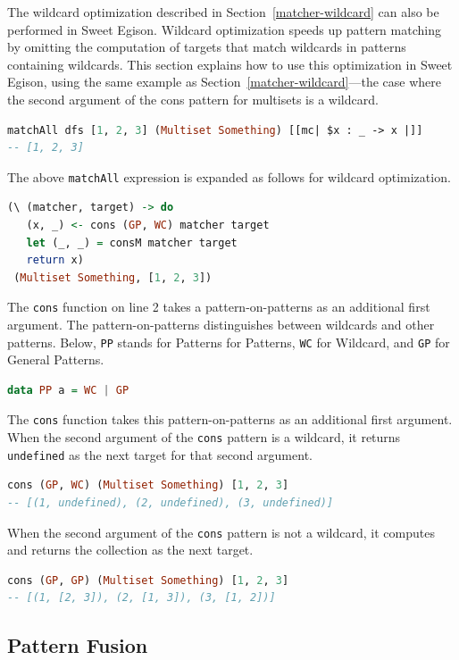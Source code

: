 The wildcard optimization described in Section~\ref{matcher-wildcard} can also be performed in Sweet Egison.
Wildcard optimization speeds up pattern matching by omitting the computation of targets that match wildcards in patterns containing wildcards.
This section explains how to use this optimization in Sweet Egison, using the same example as Section~\ref{matcher-wildcard}---the case where the second argument of the cons pattern for multisets is a wildcard.
\begin{lstlisting}[language=haskell,numbers=none]
matchAll dfs [1, 2, 3] (Multiset Something) [[mc| $x : _ -> x |]]
-- [1, 2, 3]
\end{lstlisting}
The above \lstinline{matchAll} expression is expanded as follows for wildcard optimization.
\begin{lstlisting}[language=haskell,numbers=none]
(\ (matcher, target) -> do
   (x, _) <- cons (GP, WC) matcher target
   let (_, _) = consM matcher target
   return x)
 (Multiset Something, [1, 2, 3])
\end{lstlisting}
The \lstinline{cons} function on line 2 takes a pattern-on-patterns as an additional first argument.
The pattern-on-patterns distinguishes between wildcards and other patterns.
Below, \lstinline{PP} stands for Patterns for Patterns, \lstinline{WC} for Wildcard, and \lstinline{GP} for General Patterns.
\begin{lstlisting}[language=haskell,numbers=none]
data PP a = WC | GP
\end{lstlisting}
The \lstinline{cons} function takes this pattern-on-patterns as an additional first argument.
When the second argument of the \lstinline{cons} pattern is a wildcard, it returns \lstinline{undefined} as the next target for that second argument.
\begin{lstlisting}[language=haskell,numbers=none]
cons (GP, WC) (Multiset Something) [1, 2, 3]
-- [(1, undefined), (2, undefined), (3, undefined)]
\end{lstlisting}
When the second argument of the \lstinline{cons} pattern is not a wildcard, it computes and returns the collection as the next target.
\begin{lstlisting}[language=haskell,numbers=none]
cons (GP, GP) (Multiset Something) [1, 2, 3]
-- [(1, [2, 3]), (2, [1, 3]), (3, [1, 2])]
\end{lstlisting}

\subsection{Pattern Fusion}

